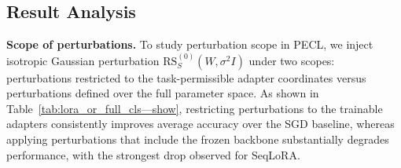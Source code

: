 \documentclass[10pt]{article} %
\begin{document}
\subsection{Result Analysis}





\noindent\textbf{Scope of perturbations.}\quad
To study perturbation scope in PECL, we inject isotropic Gaussian perturbation $\mathrm{RS}_S^{(0)}({W}, \sigma^2 
I)$ under two scopes: perturbations restricted to the task-permissible adapter coordinates versus perturbations defined over the full parameter space.
As shown in Table~\ref{tab:lora_or_full_cls—show}, restricting perturbations to the trainable adapters consistently improves average accuracy over the SGD baseline, whereas applying perturbations that include the frozen backbone substantially degrades performance, with the strongest drop observed for SeqLoRA.



\end{document}
